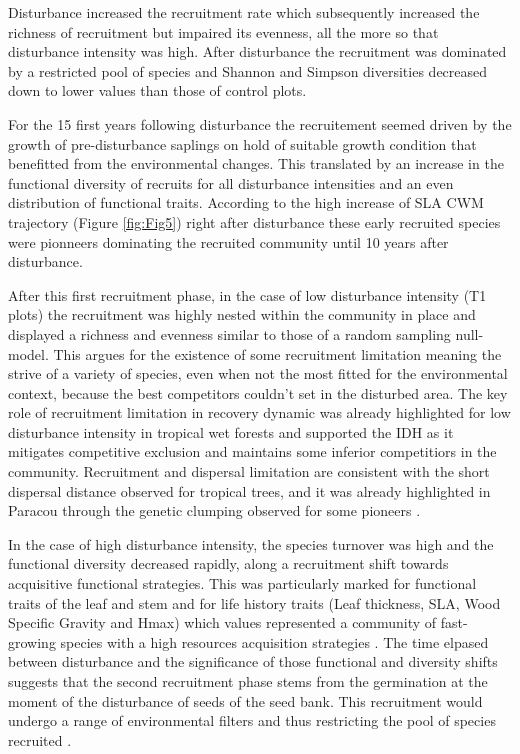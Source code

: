 \documentclass[fleqn,10pt]{ArtEcoFoG} %
\begin{document}
Disturbance increased the recruitment rate which subsequently increased
the richness of recruitment but impaired its evenness, all the more so
that disturbance intensity was high. After disturbance the recruitment
was dominated by a restricted pool of species and Shannon and Simpson
diversities decreased down to lower values than those of control plots.

For the 15 first years following disturbance the recruitement seemed
driven by the growth of pre-disturbance saplings on hold of suitable
growth condition that benefitted from the environmental changes. This
translated by an increase in the functional diversity of recruits for
all disturbance intensities and an even distribution of functional
traits. According to the high increase of SLA CWM trajectory (Figure
\ref{fig:Fig5}) right after disturbance these early recruited species
were pionneers dominating the recruited community until 10 years after
disturbance.

After this first recruitment phase, in the case of low disturbance
intensity (T1 plots) the recruitment was highly nested within the
community in place and displayed a richness and evenness similar to
those of a random sampling null-model. This argues for the existence of
some recruitment limitation meaning the strive of a variety of species,
even when not the most fitted for the environmental context, because the
best competitors couldn't set in the disturbed area. The key role of
recruitment limitation in recovery dynamic was already highlighted for
low disturbance intensity in tropical wet forests
\citep{Hubbell1999, Sheil2003, Bongers2009} and supported the IDH as it
mitigates competitive exclusion and maintains some inferior competitiors
in the community. Recruitment and dispersal limitation are consistent
with the short dispersal distance observed for tropical trees, and it
was already highlighted in Paracou through the genetic clumping observed
for some pioneers \citep{Leclerc2015, Scotti2015a}.

In the case of high disturbance intensity, the species turnover was high
and the functional diversity decreased rapidly, along a recruitment
shift towards acquisitive functional strategies. This was particularly
marked for functional traits of the leaf and stem and for life history
traits (Leaf thickness, SLA, Wood Specific Gravity and Hmax) which
values represented a community of fast-growing species with a high
resources acquisition strategies
\citep{Wright2004, Chave2009b, Herault2011, Reich2014}. The time elpased
between disturbance and the significance of those functional and
diversity shifts suggests that the second recruitment phase stems from
the germination at the moment of the disturbance of seeds of the seed
bank. This recruitment would undergo a range of environmental filters
and thus restricting the pool of species recruited \citep{Molino2001}.
\end{document}
